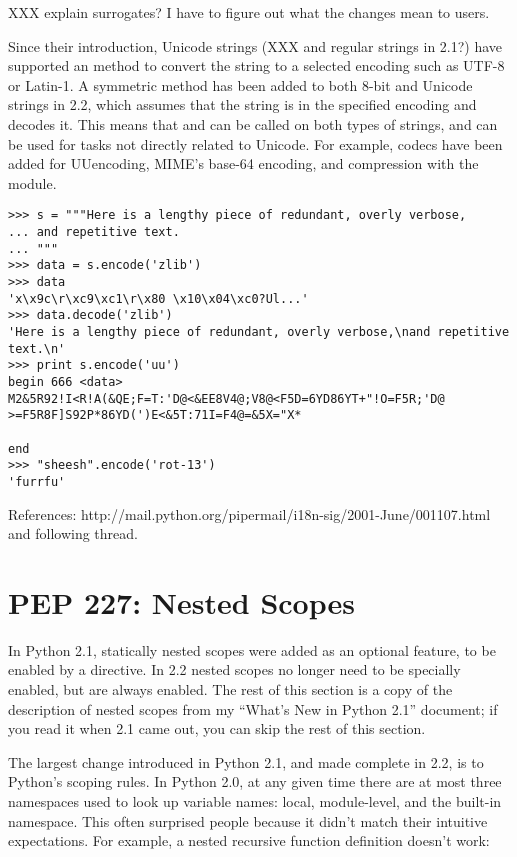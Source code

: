 \documentclass{howto}
\begin{document}
XXX explain surrogates?  I have to figure out what the changes mean to users.

Since their introduction, Unicode strings (XXX and regular strings in
2.1?)  have supported an  method to convert the
string to a selected encoding such as UTF-8 or Latin-1.  A symmetric
 method has been added to
both 8-bit and Unicode strings in 2.2, which assumes that the string
is in the specified encoding and decodes it. This means that
 and  can be called on both types of
strings, and can be used for tasks not directly related to Unicode.
For example, codecs have been added for UUencoding, MIME's base-64
encoding, and compression with the  module.

\begin{verbatim}
>>> s = """Here is a lengthy piece of redundant, overly verbose,
... and repetitive text.
... """
>>> data = s.encode('zlib')
>>> data
'x\x9c\r\xc9\xc1\r\x80 \x10\x04\xc0?Ul...'
>>> data.decode('zlib')
'Here is a lengthy piece of redundant, overly verbose,\nand repetitive text.\n'
>>> print s.encode('uu')
begin 666 <data>
M2&5R92!I<R!A(&QE;F=T:'D@<&EE8V4@;V8@<F5D=6YD86YT+"!O=F5R;'D@
>=F5R8F]S92P*86YD(')E<&5T:71I=F4@=&5X="X*

end
>>> "sheesh".encode('rot-13')
'furrfu'
\end{verbatim}

References: http://mail.python.org/pipermail/i18n-sig/2001-June/001107.html  
and following thread.

\section{PEP 227: Nested Scopes}

In Python 2.1, statically nested scopes were added as an optional
feature, to be enabled by a  directive.  In 2.2 nested scopes no longer need to be
specially enabled, but are always enabled.  The rest of this section
is a copy of the description of nested scopes from my ``What's New in
Python 2.1'' document; if you read it when 2.1 came out, you can skip
the rest of this section.

The largest change introduced in Python 2.1, and made complete in 2.2,
is to Python's scoping rules.  In Python 2.0, at any given time there
are at most three namespaces used to look up variable names: local,
module-level, and the built-in namespace.  This often surprised people
because it didn't match their intuitive expectations.  For example, a
nested recursive function definition doesn't work:
\end{document}
